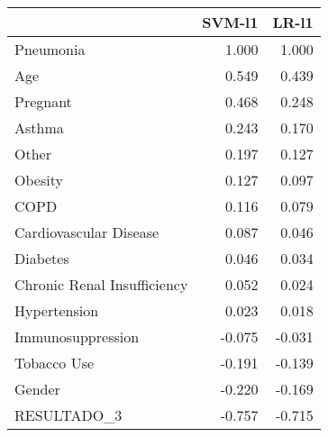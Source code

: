 \begin{tabular}{lrr}
\toprule
{} &  SVM-l1 &  LR-l1 \\
\midrule
Pneumonia                   &   1.000 &  1.000 \\
Age                         &   0.549 &  0.439 \\
Pregnant                    &   0.468 &  0.248 \\
Asthma                      &   0.243 &  0.170 \\
Other                       &   0.197 &  0.127 \\
Obesity                     &   0.127 &  0.097 \\
COPD                        &   0.116 &  0.079 \\
Cardiovascular Disease      &   0.087 &  0.046 \\
Diabetes                    &   0.046 &  0.034 \\
Chronic Renal Insufficiency &   0.052 &  0.024 \\
Hypertension                &   0.023 &  0.018 \\
Immunosuppression           &  -0.075 & -0.031 \\
Tobacco Use                 &  -0.191 & -0.139 \\
Gender                      &  -0.220 & -0.169 \\
RESULTADO\_3                 &  -0.757 & -0.715 \\
\bottomrule
\end{tabular}
